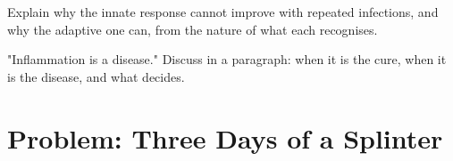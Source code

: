 \begin{exercise}[$\star\star\star$]\label{exo:g12:innate-immunity:14}
Explain why the innate response cannot improve with repeated
infections, and why the adaptive one can, from the nature of what
each recognises.
\end{exercise}

\begin{exercise}[$\star\star\star$]\label{exo:g12:innate-immunity:15}
"Inflammation is a disease." Discuss in a paragraph: when it is the
cure, when it is the disease, and what decides.
\end{exercise}

\section{Problem: Three Days of a Splinter}

